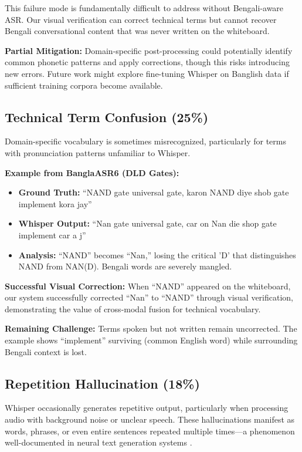 This failure mode is fundamentally difficult to address without Bengali-aware ASR. Our visual verification can correct technical terms but cannot recover Bengali conversational content that was never written on the whiteboard.

\textbf{Partial Mitigation:} Domain-specific post-processing could potentially identify common phonetic patterns and apply corrections, though this risks introducing new errors. Future work might explore fine-tuning Whisper on Banglish data if sufficient training corpora become available.

\subsection{Technical Term Confusion (25\%)}

Domain-specific vocabulary is sometimes misrecognized, particularly for terms with pronunciation patterns unfamiliar to Whisper.

\textbf{Example from BanglaASR6 (DLD Gates):}

\begin{itemize}
    \item \textbf{Ground Truth:} ``NAND gate universal gate, karon NAND diye shob gate implement kora jay''
    \item \textbf{Whisper Output:} ``Nan gate universal gate, car on Nan die shop gate implement car a j''
    \item \textbf{Analysis:} ``NAND'' becomes ``Nan,'' losing the critical 'D' that distinguishes NAND from NAN(D). Bengali words are severely mangled.
\end{itemize}

\textbf{Successful Visual Correction:} When ``NAND'' appeared on the whiteboard, our system successfully corrected ``Nan'' to ``NAND'' through visual verification, demonstrating the value of cross-modal fusion for technical vocabulary.

\textbf{Remaining Challenge:} Terms spoken but not written remain uncorrected. The example shows ``implement'' surviving (common English word) while surrounding Bengali context is lost.

\subsection{Repetition Hallucination (18\%)}

Whisper occasionally generates repetitive output, particularly when processing audio with background noise or unclear speech. These hallucinations manifest as words, phrases, or even entire sentences repeated multiple times---a phenomenon well-documented in neural text generation systems \cite{Holtzman2020, Ji2023}.

